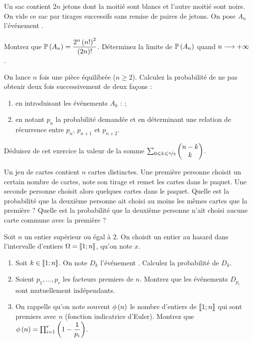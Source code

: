 \begin{exoss}
Un sac contient \(2n\) jetons dont la moitié sont blancs et l'autre moitié sont noirs. On vide ce sac par tirages successifs sans remise de paires de jetons. On pose \(A_n\) l'événement .

Montrez que \(\proba{A_n}=\dfrac{2^n\paren{n!}^2}{\paren{2n}!}\). Déterminez la limite de \(\proba{A_n}\) quand \(n\to\pinf\).
\end{exoss}

\begin{exoss}
On lance \(n\) fois une pièce équilibrée (\(n\geq2\)). Calculez la probabilité de ne pas obtenir deux fois  successivement de deux façons :

\begin{enumerate}
    \item en introduisant les événements \(A_k\) :  ; \\
    \item en notant \(p_n\) la probabilité demandée et en déterminant une relation de récurrence entre \(p_n\), \(p_{n+1}\) et \(p_{n+2}\).
\end{enumerate}

Déduisez de cet exercice la valeur de la somme \(\sum_{0\leq k\leq\nicefrac{n}{2}}\binom{k}{n-k}\).
\end{exoss}

\begin{exoss}
Un jeu de cartes contient \(n\) cartes distinctes. Une première personne choisit un certain nombre de cartes, note son tirage et remet les cartes dans le paquet. Une seconde personne choisit alors quelques cartes dans le paquet. Quelle est la probabilité que la deuxième personne ait choisi au moins les mêmes cartes que la première ? Quelle est la probabilité que la deuxième personne n'ait choisi aucune carte commune avec la première ?
\end{exoss}

\begin{exoss}
Soit \(n\) un entier supérieur ou égal à \(2\). On choisit un entier au hasard dans l'intervalle d'entiers \(\Omega=\interventierii{1}{n}\), qu'on note \(x\).

\begin{enumerate}
    \item Soit \(k\in\interventierii{1}{n}\). On note \(D_k\) l'événement . Calculez la probabilité de \(D_k\). \\
    \item Soient \(p_1,\dots,p_r\) les facteurs premiers de \(n\). Montrez que les événements \(D_{p_i}\) sont mutuellement indépendants. \\
    \item On rappelle qu'on note souvent \(\phi\paren{n}\) le nombre d'entiers de \(\interventierii{1}{n}\) qui sont premiers avec \(n\) (fonction indicatrice d'Euler). Montrez que \(\phi\paren{n}=\prod_{i=1}^r\paren{1-\dfrac{1}{p_i}}\).
\end{enumerate}
\end{exoss}

